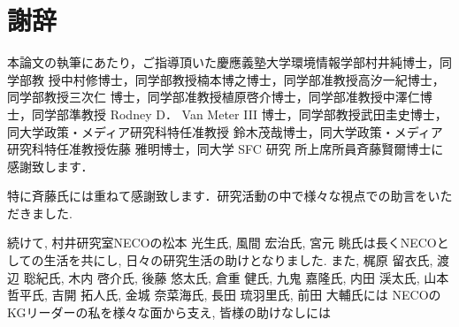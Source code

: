 \chapter*{謝辞}
\label{thanks}

本論文の執筆にあたり，ご指導頂いた慶應義塾大学環境情報学部村井純博士，同学部教
授中村修博士，同学部教授楠本博之博士，同学部准教授高汐一紀博士，同学部教授三次仁
博士，同学部准教授植原啓介博士，同学部准教授中澤仁博士，同学部準教授 Rodney D．
Van Meter III 博士，同学部教授武田圭史博士，同大学政策・メディア研究科特任准教授
鈴木茂哉博士，同大学政策・メディア研究科特任准教授佐藤 雅明博士，同大学 SFC 研究
所上席所員斉藤賢爾博士に感謝致します．

特に斉藤氏には重ねて感謝致します．研究活動の中で様々な視点での助言をいただきました. 


続けて, 村井研究室NECOの松本 光生氏, 風間 宏治氏, 宮元 眺氏は長くNECOとしての生活を共にし,
日々の研究生活の助けとなりました.
また, 梶原 留衣氏, 渡辺 聡紀氏, 木内 啓介氏, 後藤 悠太氏, 倉重 健氏, 九鬼 嘉隆氏,
内田 渓太氏, 山本 哲平氏, 吉開 拓人氏, 金城 奈菜海氏, 長田 琉羽里氏, 前田 大輔氏には
NECOのKGリーダーの私を様々な面から支え, 皆様の助けなしには


